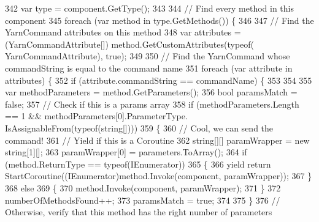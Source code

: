 \begin{DoxyCode}
342                 var type = component.GetType();
343 
344                 \textcolor{comment}{// Find every method in this component}
345                 \textcolor{keywordflow}{foreach} (var method \textcolor{keywordflow}{in} type.GetMethods()) \{
346 
347                     \textcolor{comment}{// Find the YarnCommand attributes on this method}
348                     var attributes = (YarnCommandAttribute[]) method.GetCustomAttributes(typeof(
      YarnCommandAttribute), \textcolor{keyword}{true});
349 
350                     \textcolor{comment}{// Find the YarnCommand whose commandString is equal to the command name}
351                     \textcolor{keywordflow}{foreach} (var attribute \textcolor{keywordflow}{in} attributes) \{
352                         \textcolor{keywordflow}{if} (attribute.commandString == commandName) \{
353 
354 
355                             var methodParameters = method.GetParameters();
356                             \textcolor{keywordtype}{bool} paramsMatch = \textcolor{keyword}{false};
357                             \textcolor{comment}{// Check if this is a params array}
358                             \textcolor{keywordflow}{if} (methodParameters.Length == 1 && methodParameters[0].ParameterType.
      IsAssignableFrom(typeof(\textcolor{keywordtype}{string}[])))
359                                 \{
360                                     \textcolor{comment}{// Cool, we can send the command!}
361                                     \textcolor{comment}{// Yield if this is a Coroutine}
362                                     \textcolor{keywordtype}{string}[][] paramWrapper = \textcolor{keyword}{new} \textcolor{keywordtype}{string}[1][];
363                                     paramWrapper[0] = parameters.ToArray();
364                                     \textcolor{keywordflow}{if} (method.ReturnType == typeof(IEnumerator))
365                                     \{
366                                         yield \textcolor{keywordflow}{return} StartCoroutine((IEnumerator)method.Invoke(component, 
      paramWrapper));
367                                     \}
368                                     \textcolor{keywordflow}{else}
369                                     \{
370                                         method.Invoke(component, paramWrapper);
371                                     \}
372                                     numberOfMethodsFound++;
373                                     paramsMatch = \textcolor{keyword}{true};
374 
375                             \}
376                             \textcolor{comment}{// Otherwise, verify that this method has the right number of parameters}

\end{DoxyCode}
